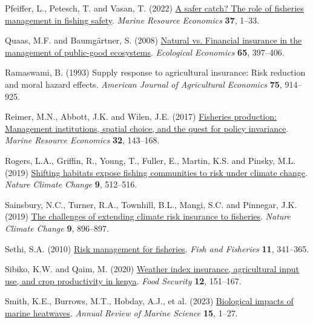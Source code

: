 \documentclass[
  letterpaper,
  DIV=11,
  numbers=noendperiod]{scrartcl}
\newlength{\cslhangindent}
\newlength{\cslentryspacingunit} %
\newenvironment{CSLReferences}[2] %
 {%
  \setlength{\parindent}{0pt}
  \ifodd #1
  \let\oldpar\par
  \def\par{\hangindent=\cslhangindent\oldpar}
  \fi
  \setlength{\parskip}{#2\cslentryspacingunit}
 }%
 {}
\theoremstyle{plain}
\theoremstyle{plain}
\theoremstyle{remark}
\begin{document}
\begin{CSLReferences}{1}{0}
\leavevmode{}%
Pfeiffer, L., Petesch, T. and Vasan, T. (2022)
\href{https://doi.org/10.1086/716856}{A safer catch? The role of
fisheries management in fishing safety}. \emph{Marine Resource
Economics} \textbf{37}, 1--33.

\leavevmode{}%
Quaas, M.F. and Baumgärtner, S. (2008)
\href{https://doi.org/10.1016/j.ecolecon.2007.07.004}{Natural vs.
Financial insurance in the management of public-good ecosystems}.
\emph{Ecological Economics} \textbf{65}, 397--406.

\leavevmode{}%
Ramaswami, B. (1993) Supply response to agricultural insurance: Risk
reduction and moral hazard effects. \emph{American Journal of
Agricultural Economics} \textbf{75}, 914--925.

\leavevmode{}%
Reimer, M.N., Abbott, J.K. and Wilen, J.E. (2017)
\href{https://doi.org/10.1086/690678}{Fisheries production: Management
institutions, spatial choice, and the quest for policy invariance}.
\emph{Marine Resource Economics} \textbf{32}, 143--168.

\leavevmode{}%
Rogers, L.A., Griffin, R., Young, T., Fuller, E., Martin, K.S. and
Pinsky, M.L. (2019)
\href{https://doi.org/10.1038/s41558-019-0503-z}{Shifting habitats
expose fishing communities to risk under climate change}. \emph{Nature
Climate Change} \textbf{9}, 512--516.

\leavevmode{}%
Sainsbury, N.C., Turner, R.A., Townhill, B.L., Mangi, S.C. and Pinnegar,
J.K. (2019) \href{https://doi.org/10.1038/s41558-019-0645-z}{The
challenges of extending climate risk insurance to fisheries}.
\emph{Nature Climate Change} \textbf{9}, 896--897.

\leavevmode{}%
Sethi, S.A. (2010)
\href{https://doi.org/10.1111/j.1467-2979.2010.00363.x}{Risk management
for fisheries}. \emph{Fish and Fisheries} \textbf{11}, 341--365.

\leavevmode{}%
Sibiko, K.W. and Qaim, M. (2020)
\href{https://doi.org/10.1007/s12571-019-00987-y}{Weather index
insurance, agricultural input use, and crop productivity in kenya}.
\emph{Food Security} \textbf{12}, 151--167.

\leavevmode{}%
Smith, K.E., Burrows, M.T., Hobday, A.J., et al. (2023)
\href{https://doi.org/10.1146/annurev-marine-032122-121437}{Biological
impacts of marine heatwaves}. \emph{Annual Review of Marine Science}
\textbf{15}, 1--27.


\end{CSLReferences}
\end{document}
